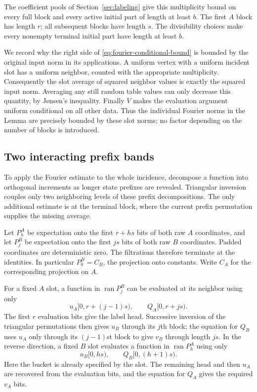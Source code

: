 The coefficient pools of Section~\ref{sec:labeling} give this
multiplicity bound on every full block and every active initial part of
length at least $b$.  The first $A$ block has length $r$; all subsequent
blocks have length $s$.  The divisibility choices make every nonempty
terminal initial part have length at least $b$.

We record why the right side of
\eqref{eq:fourier-conditional-bound} is bounded by the original input
norm in its applications.  A uniform vertex with a uniform incident
slot has a uniform neighbor, counted with the appropriate multiplicity.
Consequently the slot average of squared neighbor values is exactly the
squared input norm.  Averaging any still random table values can only
decrease this quantity, by Jensen's inequality.  Finally $V$ makes the
evaluation argument uniform conditional on all other data.  Thus the
individual Fourier norms in the Lemma are precisely bounded by these
slot norms; no factor depending on the number of blocks is introduced.

\subsection{Two interacting prefix bands}

To apply the Fourier estimate to the whole incidence, decompose a
function into orthogonal increments as longer state prefixes are revealed.
Triangular inversion couples only two neighboring levels of these
prefix decompositions.  The only additional estimate is at the terminal
block, where the current prefix permutation supplies the missing
average.

Let $P_h^A$ be expectation onto the first $r+hs$ bits of both raw
$A$ coordinates, and let $P_j^B$ be expectation onto the first $js$
bits of both raw $B$ coordinates.  Padded coordinates are deterministic
zero.  The filtrations therefore terminate at the identities.  In
particular $P_0^B=C_B$, the projection onto constants.  Write $C_A$
for the corresponding projection on $A$.

For a fixed $A$ slot, a function in $\operatorname{ran}P_j^B$ can
be evaluated at its neighbor using only
\begin{equation}\label{eq:forward-prefix-data}
 u_A[0,r+(j-1)s),\qquad Q_A[0,r+js).
\end{equation}
The first $r$ evaluation bits give the label head.  Successive inversion
of the triangular permutations then gives $u_B$ through its $j$th
block; the equation for $Q_B$ uses $u_A$ only through its $(j-1)$st
block to give $v_B$ through length $js$.
In the reverse direction, a fixed $B$ slot evaluates a function in
$\operatorname{ran}P_h^A$ using only
\begin{equation}\label{eq:reverse-prefix-data}
 u_B[0,hs),\qquad Q_B[0,(h+1)s).
\end{equation}
Here the bucket is already specified by the slot.  The remaining head
and then $u_A$ are recovered from the evaluation bits, and the equation
for $Q_A$ gives the required $v_A$ bits.

